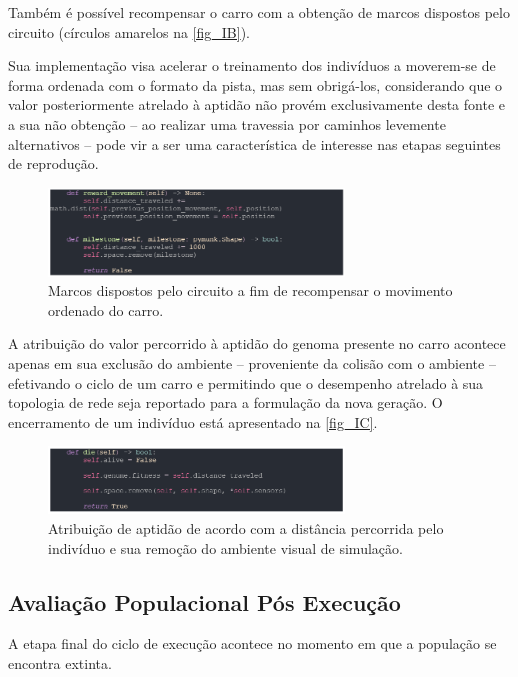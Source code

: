 Também é possível recompensar o carro com a obtenção de marcos dispostos pelo circuito (círculos amarelos na \autoref{fig_IB}). 

Sua implementação visa acelerar o treinamento dos indivíduos a moverem-se de forma ordenada com o formato da pista, mas sem obrigá-los, considerando que o valor posteriormente atrelado à aptidão não provém exclusivamente desta fonte e a sua não obtenção – ao realizar uma travessia por caminhos levemente alternativos – pode vir a ser uma característica de interesse nas etapas seguintes de reprodução.

\begin{figure}[htb]
        \centering
        \caption{\label{fig_IB}Marcos dispostos pelo circuito a fim de recompensar o movimento ordenado do carro.}
        \includegraphics[width=0.7\textwidth]{images/IB.png}
\end{figure}

A atribuição do valor percorrido à aptidão do genoma presente no carro acontece apenas em sua exclusão do ambiente – proveniente da colisão com o ambiente – efetivando o ciclo de um carro e permitindo que o desempenho atrelado à sua topologia de rede seja reportado para a formulação da nova geração. O encerramento de um indivíduo está apresentado na \autoref{fig_IC}.

\begin{figure}[htb]
        \centering
        \caption{\label{fig_IC}Atribuição de aptidão de acordo com a distância percorrida pelo indivíduo e sua remoção do ambiente visual de simulação.}
        \includegraphics[width=0.7\textwidth]{images/IC.png}
\end{figure}

\subsection{Avaliação Populacional Pós Execução}
A etapa final do ciclo de execução acontece no momento em que a população se encontra extinta.

